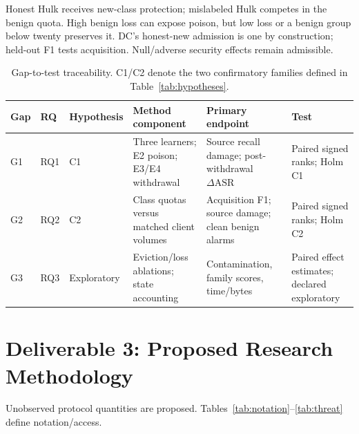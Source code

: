 \documentclass[10pt,a4paper]{article}
\begin{document}
Honest Hulk receives new-class protection; mislabeled Hulk competes in the benign quota. High benign loss can expose poison, but low loss or a benign group below twenty preserves it. DC's honest-new admission is one by construction; held-out F1 tests acquisition. Null/adverse security effects remain admissible.

\begin{table}[htbp]
\centering\footnotesize
\caption{Gap-to-test traceability. C1/C2 denote the two confirmatory families defined in Table~\ref{tab:hypotheses}.}
\label{tab:trace}
\begin{tabularx}{\linewidth}{L{0.7cm}L{0.8cm}L{1.2cm}Y Y Y}
\toprule
Gap & RQ & Hypothesis & Method component & Primary endpoint & Test\\
\midrule
G1 & RQ1 & C1 & Three learners; E2 poison; E3/E4 withdrawal & Source recall damage; post-withdrawal $\Delta\mathrm{ASR}$ & Paired signed ranks; Holm C1\\
G2 & RQ2 & C2 & Class quotas versus matched client volumes & Acquisition F1; source damage; clean benign alarms & Paired signed ranks; Holm C2\\
G3 & RQ3 & Exploratory & Eviction/loss ablations; state accounting & Contamination, family scores, time/bytes & Paired effect estimates; declared exploratory\\
\bottomrule
\end{tabularx}
\end{table}

\section{Deliverable 3: Proposed Research Methodology}
Unobserved protocol quantities are proposed. Tables~\ref{tab:notation}--\ref{tab:threat} define notation/access.
\end{document}

